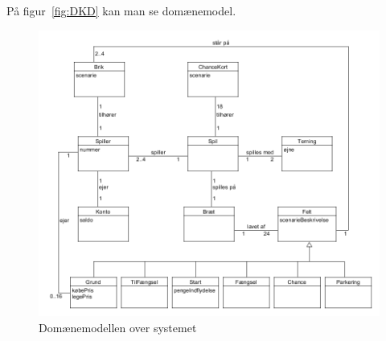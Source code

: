\documentclass[class=article, crop=false]{standalone}
\begin{document}
    På figur~\ref{fig:DKD} kan man se domænemodel.
    \begin{figure}[H]
        \centeringdom
        \includegraphics[scale = 0.2]{diagrams_png/domain_model.png}
        \caption{Domænemodellen over systemet}\label{fig:domain_model}
    \end{figure}
\end{document}
